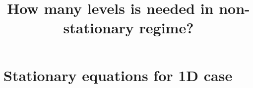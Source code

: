 \documentclass{article}
\title{How many levels is needed in non-stationary regime?}
\begin{document}
\maketitle
    
\section{Stationary equations for 1D case}
\end{document}
